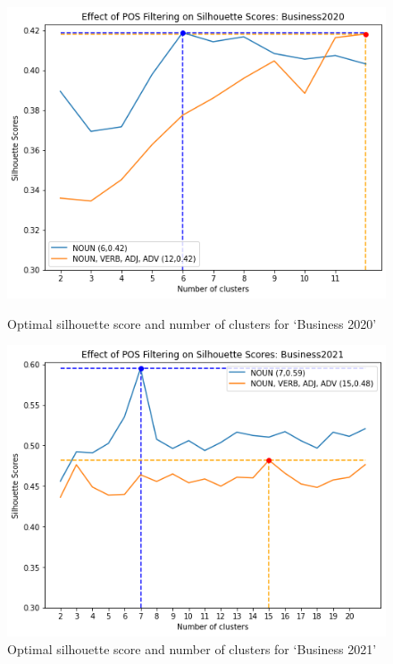 \begin{figure}[H]
\centering
  \begin{minipage}[t]{.49\linewidth}
    \centering
    \includegraphics[width=\linewidth]{images/eval/business2020_sil.png}
    \caption{Optimal silhouette score and number of clusters for `Business 2020' }
    \label{fig:pos_business2020}
  \end{minipage}
  \begin{minipage}[t]{.49\textwidth}
    \centering
    \includegraphics[width=\linewidth]{images/eval/business2021_sil.png}
    \caption{Optimal silhouette score and number of clusters for `Business 2021'}
    \label{fig:pos_business2021}
  \end{minipage}

\end{figure}
